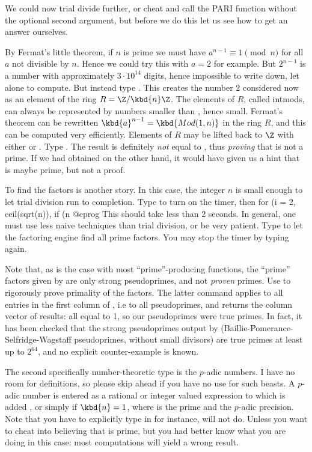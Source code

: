 We could now trial divide further, or cheat and call the PARI function
 without the optional second argument, but before we do this let
us see how to get an answer ourselves.

By Fermat's little theorem, if $n$ is prime we must have $a^{n-1}\equiv 1
\pmod{n}$ for all $a$ not divisible by $n$. Hence we could try this with $a=2$
for example. But $2^{n-1}$ is a number with approximately $3\cdot10^{14}$
digits, hence impossible to write down, let alone to compute. But instead type
. This creates the number $2$ considered now as an element
of the ring $R = \Z/\kbd{n}\Z$. The elements of $R$, called intmods, can
always be represented by numbers smaller than , hence small. Fermat's
theorem can be rewritten
%
$\kbd{a}^{n-1} = \kbd{Mod(1,n)}$
%
in the ring $R$, and this can be computed very efficiently. Elements of $R$
may be lifted back to $\Z$ with either  or . Type
. The result is definitely \emph{not} equal to
, thus \emph{proving} that  is not a prime. If we had
obtained  on the other hand, it would have given us a hint that
 is maybe prime, but not a proof.

To find the factors is another story. In this case, the integer $n$ is small
 enough to let trial division run to completion. Type \kbd{\#} to turn on the
 timer, then
\bprog
  for (i = 2, ceil(sqrt(n)), if (n%
@eprog\noindent
This should take less than 2 seconds. In general, one must use less naive
techniques than trial division, or be very patient. Type 
to let the factoring engine find all prime factors. You may stop the timer by
typing \kbd{\#} again.

Note that, as is the case with most ``prime''-producing functions, the
``prime'' factors given by  are only strong pseudoprimes, and not
\emph{proven} primes.  Use  to rigorously prove
primality of the factors. The latter command applies  to all
entries in the first column of , i.e to all pseudoprimes, and returns
the column vector of results: all equal to 1, so our pseudoprimes were
true primes. In fact, it has been checked that the strong
pseudoprimes output by  (Baillie-Pomerance-Selfridge-Wagstaff
pseudoprimes, without small divisors) are true primes at least up to
$2^{64}$, and no explicit counter-example is known.\smallskip

The second specifically number-theoretic type is the $p$-adic numbers. I have
no room for definitions, so please skip ahead if you have no use for such
beasts. A $p$-adic number is entered as a rational or integer valued
expression to which is added , or simply  if
$\kbd{n}=1$, where  is the prime and  the $p$-adic precision.
Note that you have to explicitly type in  for instance, 
will not do. Unless you want to cheat  into believing that 
is prime, but you had better know what you are doing in this case: most
computations will yield a wrong result.

